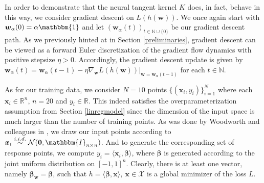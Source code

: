 \documentclass{article}
\begin{document}
In order to demonstrate that the neural tangent kernel $K$ does, in fact, behave in this way, we consider gradient descent on $L(h(\boldsymbol{w}))$.  We once again start with $\boldsymbol{w}_{\alpha}(0) = \alpha \mathbbm{1}$ and let $(\boldsymbol{w}_{\alpha}(t))_{t \in \mathbb{N}\cup \{0\}}$ be our gradient descent path. As we previously hinted at in Section \ref{preliminaries}, gradient descent can be viewed as a forward Euler discretization of the gradient flow dynamics with positive stepsize $\eta > 0$. Accordingly, the gradient descent update is given by $\boldsymbol{w}_{\alpha}(t) = \boldsymbol{w}_{\alpha}(t-1) - \eta \nabla_{\boldsymbol{w}} L(h(\boldsymbol{w}))|_{\boldsymbol{w} = \boldsymbol{w}_{\alpha}(t-1)}$ for each $t \in \mathbb{N}$.

As for our training data, we consider $N=10$ points $\{ (\boldsymbol{x}_i, y_i) \}_{i=1}^N$ where each $\boldsymbol{x}_i \in \mathbb{R}^{n}$, $n = 20$ and $y_i \in \mathbb{R}$. This indeed satisfies the overparameterization assumption from Section \ref{linregmodel} since the dimension of the input space is much larger than the number of training points. As was done by Woodworth and colleagues in \cite{woodworth2020kernel}, we draw our input points according to $\boldsymbol{x}_i \overset{i.i.d.}{\sim} \mathcal{N}(\boldsymbol{0}, \mathbbm{I}_{n \times n})$. And to generate the corresponding set of response points, we compute $y_i = \langle \boldsymbol{x}_i, \boldsymbol{\beta} \rangle$, where $\boldsymbol{\beta}$ is generated according to the joint uniform distribution on $[-1, 1]^n$. Clearly, there is at least one vector, namely $\boldsymbol{\beta}_{\boldsymbol{w}} = \boldsymbol{\beta}$, such that $h = \langle \boldsymbol{\beta}, \boldsymbol{x} \rangle, \ \boldsymbol{x} \in \mathcal{X}$ is a global minimizer of the loss $L$.
\end{document}
